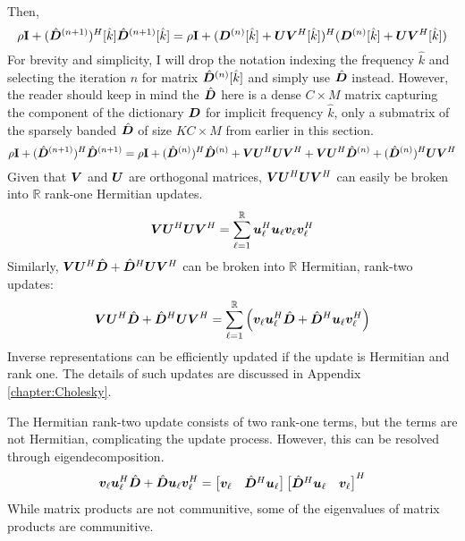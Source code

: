 Then,
%
\begin{equation}
\rho{\bf I} + (\hat{\bm{D}}^{(n + 1)})^H[\hat{k}]\hat{\bm{D}}^{(n + 1)}[\hat{k}] = \rho{\bf I} + (\bm{D}^{(n)}[\hat{k}] + \bm{U}\bm{V}^H[\hat{k}])^H(\bm{D}^{(n)}[\hat{k}] + \bm{U}\bm{V}^H[\hat{k}])
\end{equation}
%
For brevity and simplicity, I will drop the notation indexing the frequency $\hat{k}$ and selecting the iteration $n$ for matrix $\hat{\bm{D}}^{(n)}[\hat{k}]$ and simply use $\hat{\bm{D}}$ instead. However, the reader should keep in mind the $\hat{\bm{D}}$ here is a dense $C \times M$ matrix capturing the component of the dictionary $\bm{D}$ for implicit frequency $\hat{k}$, only a submatrix of the sparsely banded $\hat{\bm{D}}$ of size $KC \times M$ from earlier in this section.
%
\begin{equation}
\rho{\bf I} + (\hat{\bm{D}}^{(n + 1)})^H\hat{\bm{D}}^{(n + 1)} = \rho{\bf I} + (\hat{\bm{D}}^{(n)})^H\hat{\bm{D}}^{(n)} + \bm{V}\bm{U}^H \bm{U}\bm{V}^H + \bm{V}\bm{U}^H\hat{\bm{D}}^{(n)} + (\hat{\bm{D}}^{(n)})^H\bm{U}\bm{V}^H
\end{equation}
%
Given that $\bm{V}$ and $\bm{U}$ are orthogonal matrices, $\bm{V}\bm{U}^H\bm{U}\bm{V}^H$ can easily be broken into $\mathbb{R}$ rank-one Hermitian updates.
%
\begin{equation}
\bm{V}\bm{U}^H\bm{U}\bm{V}^H = \sum_{\ell = 1}^{\mathbb{R}} \bm{u}_{\ell}^H\bm{u}_{\ell}\bm{v}_{\ell}\bm{v}_{\ell}^H
\end{equation}
%
Similarly, $\bm{V}\bm{U}^H\hat{\bm{D}} + \hat{\bm{D}}^H\bm{U}\bm{V}^H$ can be broken into $\mathbb{R}$ Hermitian, rank-two updates:
%
\begin{equation}
\bm{V}\bm{U}^H\hat{\bm{D}} + \hat{\bm{D}}^H\bm{U}\bm{V}^H = \sum_{\ell = 1}^{\mathbb{R}} \left( \bm{v}_{\ell}\bm{u}_{\ell}^H\hat{\bm{D}} + \hat{\bm{D}}^H\bm{u}_{\ell}\bm{v}_{\ell}^H \right)
\end{equation}
%
%
Inverse representations can be efficiently updated if the update is Hermitian and rank one. The details of such updates are discussed in Appendix \ref{chapter:Cholesky}.

The Hermitian rank-two update consists of two rank-one terms, but the terms are not Hermitian, complicating the update process. However, this can be resolved through eigendecomposition.  
%
\begin{equation}
\bm{v}_{\ell}\bm{u}_{\ell}^H \hat{\bm{D}} + \hat{\bm{D}}\bm{u}_{\ell}\bm{v}_{\ell}^H = \begin{bmatrix}
\bm{v}_{\ell} & \hat{\bm{D}}^H\bm{u}_{\ell} 
\end{bmatrix}
\begin{bmatrix}
\hat{\bm{D}}^H\bm{u}_{\ell} & \bm{v}_{\ell}
\end{bmatrix}^H
\end{equation}
%
While matrix products are not communitive, some of the eigenvalues of matrix products are communitive.

